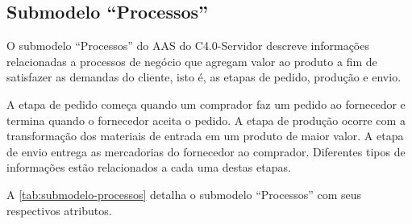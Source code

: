 \subsection{Submodelo ``Processos''}

O submodelo ``Processos'' do AAS do C4.0-Servidor descreve informações relacionadas a processos de negócio que agregam valor ao produto a fim de satisfazer as demandas do cliente, isto é, as etapas de pedido, produção e envio.

A etapa de pedido começa quando um comprador faz um pedido ao fornecedor e termina quando o fornecedor aceita o pedido. A etapa de produção ocorre com a transformação dos materiais de entrada em um produto de maior valor. A etapa de envio entrega as mercadorias do fornecedor ao comprador. Diferentes tipos de informações estão relacionados a cada uma destas etapas.

A \autoref{tab:submodelo-processos} detalha o submodelo ``Processos'' com seus respectivos atributos.

